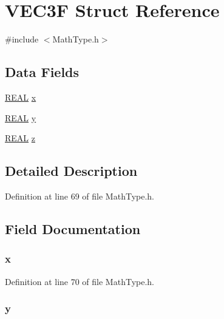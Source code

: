 \hypertarget{struct_v_e_c3_f}{\section{V\-E\-C3\-F Struct Reference}
\label{struct_v_e_c3_f}
}


{\ttfamily \#include $<$Math\-Type.\-h$>$}

\subsection*{Data Fields}
\begin{DoxyCompactItemize}
\item 
\hyperlink{_math_type_8h_a5821460e95a0800cf9f24c38915cbbde}{R\-E\-A\-L} \hyperlink{struct_v_e_c3_f_ad14343030eb6dd7eb6a9c8b4c52fecb0}{x}
\item 
\hyperlink{_math_type_8h_a5821460e95a0800cf9f24c38915cbbde}{R\-E\-A\-L} \hyperlink{struct_v_e_c3_f_a1aa467ce26c2e3301d0b78836e30cab0}{y}
\item 
\hyperlink{_math_type_8h_a5821460e95a0800cf9f24c38915cbbde}{R\-E\-A\-L} \hyperlink{struct_v_e_c3_f_a9195b0e2ec564479b8a02cc3357410b7}{z}
\end{DoxyCompactItemize}


\subsection{Detailed Description}


Definition at line 69 of file Math\-Type.\-h.



\subsection{Field Documentation}
\hypertarget{struct_v_e_c3_f_ad14343030eb6dd7eb6a9c8b4c52fecb0}{
\subsubsection[{x}]{ x}}\label{struct_v_e_c3_f_ad14343030eb6dd7eb6a9c8b4c52fecb0}


Definition at line 70 of file Math\-Type.\-h.

\hypertarget{struct_v_e_c3_f_a1aa467ce26c2e3301d0b78836e30cab0}{
\subsubsection[{y}]{ y}}\label{struct_v_e_c3_f_a1aa467ce26c2e3301d0b78836e30cab0}


